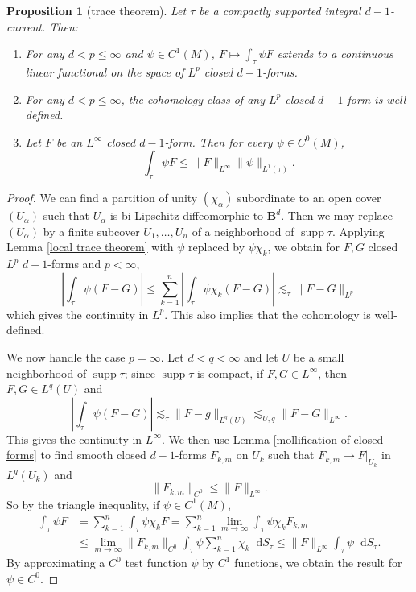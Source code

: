 \documentclass[reqno,11pt]{amsart}
\newcommand{\Ball}{\mathbf{B}}
\newcommand*\dif{\mathop{}\!\mathrm{d}}
\DeclareMathOperator{\supp}{supp}
\newtheorem{proposition}[theorem]{Proposition}
\theoremstyle{definition}
\numberwithin{equation}{section}
\begin{document}
\begin{proposition}[trace theorem]\label{integration is welldefined}
Let $\tau$ be a compactly supported integral $d-1$-current.
Then:
\begin{enumerate}
\item For any $d < p \leq \infty$ and $\psi \in C^1(M)$, $F \mapsto \int_\tau \psi F$ extends to a continuous linear functional on the space of $L^p$ closed $d-1$-forms.
\item For any $d < p \leq \infty$, the cohomology class of any $L^p$ closed $d - 1$-form is well-defined.
\item Let $F$ be an $L^\infty$ closed $d - 1$-form. Then for every $\psi \in C^0(M)$,
\begin{equation}\label{integral over chain is linfinity}
	\int_\tau \psi F \leq \|F\|_{L^\infty} \|\psi\|_{L^1(\tau)}.
\end{equation}
\end{enumerate}
\end{proposition}
\begin{proof}
We can find a partition of unity $(\chi_\alpha)$ subordinate to an open cover $(U_\alpha)$ such that $U_\alpha$ is bi-Lipschitz diffeomorphic to $\Ball^d$.
Then we may replace $(U_\alpha)$ by a finite subcover $U_1, \dots, U_n$ of a neighborhood of $\supp \tau$.
Applying Lemma \ref{local trace theorem} with $\psi$ replaced by $\psi \chi_k$, we obtain for $F, G$ closed $L^p$ $d - 1$-forms and $p < \infty$,
$$\left|\int_\tau \psi(F - G)\right| \leq \sum_{k = 1}^n \left|\int_\tau \psi \chi_k (F - G)\right| \lesssim_\tau \|F - G\|_{L^p}$$
which gives the continuity in $L^p$.
This also implies that the cohomology is well-defined.

We now handle the case $p = \infty$.
Let $d < q < \infty$ and let $U$ be a small neighborhood of $\supp \tau$; since $\supp \tau$ is compact, if $F, G \in L^\infty$, then $F, G \in L^q(U)$ and 
$$\left|\int_\tau \psi(F - G)\right| \lesssim_\tau \|F - g\|_{L^q(U)} \lesssim_{U, q} \|F - G\|_{L^\infty}.$$
This gives the continuity in $L^\infty$.
We then use Lemma \ref{mollification of closed forms} to find smooth closed $d - 1$-forms $F_{k, m}$ on $U_k$ such that $F_{k, m} \to F|_{U_k}$ in $L^q(U_k)$ and
$$\|F_{k, m}\|_{C^0} \leq \|F\|_{L^\infty}.$$
So by the triangle inequality, if $\psi \in C^1(M)$,
\begin{align*}
\int_\tau \psi F 
&= \sum_{k = 1}^n \int_\tau \psi \chi_k F 
= \sum_{k = 1}^n \lim_{m \to \infty} \int_\tau \psi \chi_k F_{k, m} \\
&\leq \lim_{m \to \infty} \|F_{k, m}\|_{C^0} \int_\tau \psi \sum_{k = 1}^n \chi_k \dif S_\tau 
\leq \|F\|_{L^\infty} \int_\tau \psi \dif S_\tau.
\end{align*}
By approximating a $C^0$ test function $\psi$ by $C^1$ functions, we obtain the result for $\psi \in C^0$.
\end{proof}
\end{document}

